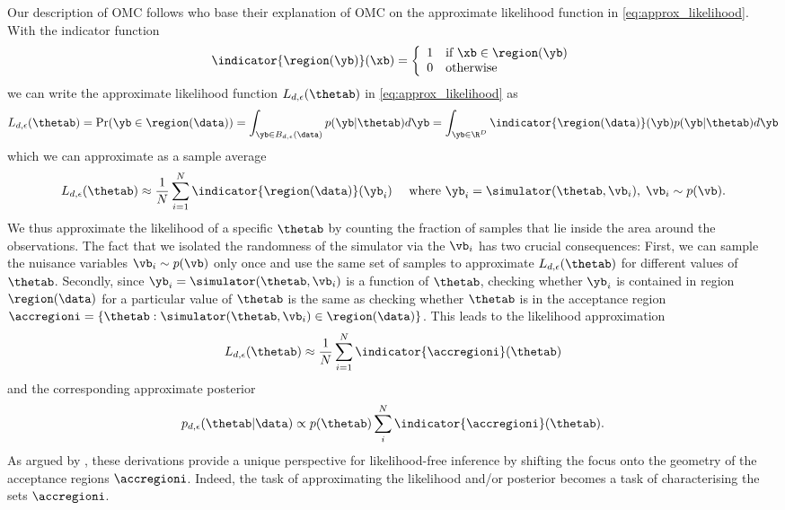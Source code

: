 Our description of OMC \citep{Meeds2015} follows \citet{Ikonomov2019}
who base their explanation of OMC on the approximate likelihood
function in \eqref{eq:approx_likelihood}. With the indicator function
%
\begin{equation} \label{eq:indicator} \indicator{\region(\yb)}(\xb)=
  \left\{
    \begin{array}{ll}
      1 & \mbox{if } \xb \in \region(\yb) \\
      0 & \mbox{otherwise} 
    \end{array} \right. \end{equation}
%
we can write the approximate likelihood function $L_{d, \epsilon}(\thetab)$ in \eqref{eq:approx_likelihood} as
\begin{gather} \label{eq:approx_likelihood_omc}
  L_{d, \epsilon}(\thetab) = \Pr(\yb \in \region(\data)) =
  \int_{\yb \in B_{d,\epsilon}(\data)}p(\yb|\thetab)d\yb =
  \int_{\yb \in \R^D} \indicator{\region(\data)}(\yb)p(\yb|\thetab)d\yb
\end{gather}
which we can approximate as a sample average
\begin{equation}
L_{d, \epsilon}(\thetab) \approx \frac{1}{N} \sum_{i=1}^N \indicator{\region (\data)} (\yb_i)
 \quad \text{ where } \yb_i = \simulator(\thetab, \vb_i),\; \vb_i \sim p(\vb). \label{eq:alt_view}
\end{equation}
We thus approximate the likelihood of a specific $\thetab$ by counting
the fraction of samples that lie inside the area around the
observations. The fact that we isolated the randomness of the
simulator via the $\vb_i$ has two crucial consequences: First, we can
sample the nuisance variables $\vb_i \sim p(\vb)$ only once and use
the same set of samples to approximate $L_{d,\epsilon}(\thetab)$ for
different values of $\thetab$. Secondly, since
$\yb_i=\simulator(\thetab, \vb_i)$ is a function of $\thetab$,
checking whether $\yb_i$ is contained in region $\region (\data)$ for
a particular value of $\thetab$ is the same as checking whether
$\thetab$ is in the acceptance region $\accregioni
= \{ \thetab: \simulator(\thetab, \vb_i) \in \region(\data) \}$. This
leads to the likelihood approximation
\begin{equation}
L_{d, \epsilon}(\thetab) \approx \frac{1}{N} \sum_{i=1}^N \indicator{\accregioni}(\thetab) \label{eq:alt_view_theta}
\end{equation}
and the corresponding approximate posterior
\begin{equation} \label{eq:approx_posterior_omc}
  p_{d,\epsilon}(\thetab|\data) \propto
  p(\thetab) \sum_i^N  \indicator{\accregioni}(\thetab).
\end{equation}
As argued by \citet{Ikonomov2019}, these derivations provide a unique
perspective for likelihood-free inference by shifting the focus onto
the geometry of the acceptance regions $\accregioni$. Indeed, the task
of approximating the likelihood and/or posterior becomes a task of
characterising the sets $\accregioni$.

